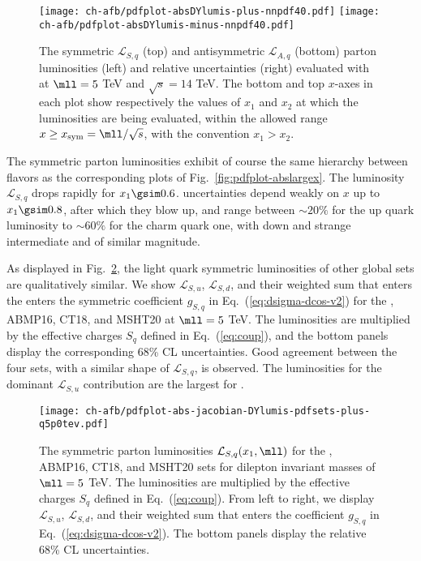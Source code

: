 \begin{figure}[!t]
 \centering
 \texttt{[image: ch-afb/pdfplot-absDYlumis-plus-nnpdf40.pdf]}
 \texttt{[image: ch-afb/pdfplot-absDYlumis-minus-nnpdf40.pdf]}
 \caption{The symmetric $\mathcal{L}_{S,q}$ (top)
   and antisymmetric $\mathcal{L}_{A,q}$ (bottom)
   parton
   luminosities (left) and relative uncertainties (right) evaluated with
    \nnlo at $\mll=5$ TeV and $\sqrt{s}=14$ TeV.
The bottom  and top $x$-axes in each plot show respectively the values
of $x_1$ and $x_2$  at which the
luminosities are being evaluated, within the allowed range
$x \ge x_{\rm sym}=\mll/\sqrt{s}$, with the convention $x_1>x_2$.}    
 \label{fig:pdfplot-absDYlumis-plus-nnpdf40}
\end{figure}

The symmetric parton luminosities exhibit of course the same hierarchy
between flavors
as the corresponding \pdf plots of Fig.~\ref{fig:pdfplot-abslargex}. 
%
The luminosity $\mathcal{L}_{S,q}$  drops rapidly for
$x_1\gsim 0.6$. \pdf  uncertainties  depend weakly on  $x$
up to $x_1\gsim 0.8$, after which they blow up, and range between $\sim 20\%$
for the up quark luminosity to $\sim 60\%$ for the charm quark one,
with down and strange intermediate and of similar magnitude.

As displayed in Fig.~\ref{fig:mll_dep_lumi_plus}, the light quark symmetric luminosities of other global \pdf sets
are qualitatively similar.
%
We show $\mathcal{L}_{S,u}$,  $\mathcal{L}_{S,d}$,
and their weighted sum that enters the  enters the
symmetric coefficient $g_{S,q}$ in Eq.~(\ref{eq:dsigma-dcos-v2})
for the , ABMP16,
CT18, and MSHT20 at $\mll=5$ TeV.
%
The luminosities are multiplied by the effective charges
$S_q$ defined in Eq.~(\ref{eq:coup}),
and the bottom panels display the corresponding 68\% CL \pdf uncertainties.
%
Good agreement between the four sets, with a similar shape
of $\mathcal{L}_{S,q}$, is observed.
%
The \pdf luminosities for the dominant $\mathcal{L}_{S,u}$ contribution are the largest for .

\begin{figure}[!t]
 \centering
 \texttt{[image: ch-afb/pdfplot-abs-jacobian-DYlumis-pdfsets-plus-q5p0tev.pdf]}
  \caption{The symmetric 
   parton luminosities $\mathcal{L}_{S,q}(x_1,\mll)$ for the , ABMP16,
   CT18, and MSHT20 \nnlo \pdf sets for dilepton
   invariant masses of $\mll=5$ TeV.
   The luminosities are multiplied by the effective charges
   $S_q$ defined in Eq.~(\ref{eq:coup}).
   From left to right, we display $\mathcal{L}_{S,u}$,  $\mathcal{L}_{S,d}$,
   and their weighted sum that enters the  coefficient $g_{S,q}$ in Eq.~(\ref{eq:dsigma-dcos-v2}).
   The bottom panels display the relative 68\% CL \pdf uncertainties.
    }    
 \label{fig:mll_dep_lumi_plus}
\end{figure}

